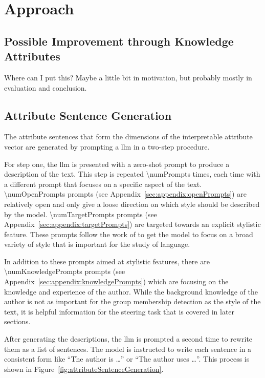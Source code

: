 \chapter{Approach}
\label{sec:approach}

\section{Possible Improvement through Knowledge Attributes}
\label{sec:approach:knowledgeAttributes}
Where can I put this? Maybe a little bit in motivation, but probably mostly in evaluation and conclusion.


\section{Attribute Sentence Generation}
\label{sec:approach:attributeSentenceGeneration}

The attribute sentences that form the dimensions of the interpretable attribute vector are generated by prompting a \acf{llm} in a two-step procedure.

For step one, the \ac{llm} is presented with a zero-shot prompt to produce a description of the text. This step is repeated \num{\numPrompts} times, each time with a different prompt that focuses on a specific aspect of the text. \num{\numOpenPrompts} prompts (see Appendix~\ref{sec:appendix:openPrompts}) are relatively open and only give a loose direction on which style should be described by the model. \num{\numTargetPrompts} prompts (see Appendix~\ref{sec:appendix:targetPrompts}) are targeted towards an explicit stylistic feature. These prompts follow the work of \citet{patelLearningInterpretableStyle2023,tausczikPsychologicalMeaningWords2010} to get the model to focus on a broad variety of style that is important for the study of language.

In addition to these prompts aimed at stylistic features, there are \num{\numKnowledgePrompts} prompts (see Appendix~\ref{sec:appendix:knowledgePrompts}) which are focusing on the knowledge and experience of the author. While the background knowledge of the author is not as important for the group membership detection as the style of the text, it is helpful information for the steering task that is covered in later sections.

After generating the descriptions, the \ac{llm} is prompted a second time to rewrite them as a list of sentences. The model is instructed to write each sentence in a consistent form like \enquote{The author is \ldots} or \enquote{The author uses \ldots}. This process is shown in Figure~\ref{fig:attributeSentenceGeneration}.


